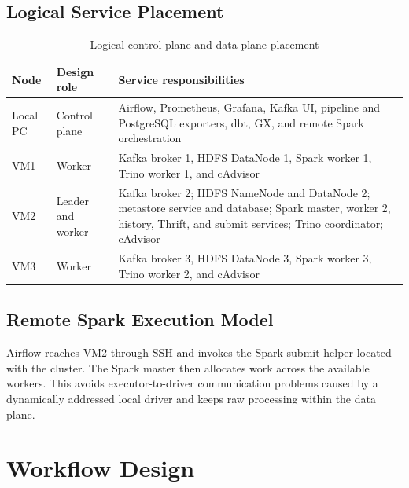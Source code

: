\subsection{Logical Service Placement}
\begin{table}[htbp]
    \centering
    \footnotesize
    \begin{tabularx}{\textwidth}{|>{\RaggedRight\arraybackslash}p{}|>{\RaggedRight\arraybackslash}p{}|>{\RaggedRight\arraybackslash}X|}
        \hline
        \rowcolor{ModernTableHeader}
        \color{white}\textbf{Node} & \color{white}\textbf{Design role} & \color{white}\textbf{Service responsibilities} \\
        \hline
        Local PC & Control plane & Airflow, Prometheus, Grafana, Kafka UI, pipeline and PostgreSQL exporters, dbt, GX, and remote Spark orchestration \\
        \hline
        VM1 & Worker & Kafka broker 1, HDFS DataNode 1, Spark worker 1, Trino worker 1, and cAdvisor \\
        \hline
        VM2 & Leader and worker & Kafka broker 2; HDFS NameNode and DataNode 2; metastore service and database; Spark master, worker 2, history, Thrift, and submit services; Trino coordinator; cAdvisor \\
        \hline
        VM3 & Worker & Kafka broker 3, HDFS DataNode 3, Spark worker 3, Trino worker 2, and cAdvisor \\
        \hline
    \end{tabularx}
    \caption{Logical control-plane and data-plane placement}
    \label{tab:design-logical-placement}
\end{table}

\subsection{Remote Spark Execution Model}
Airflow reaches VM2 through SSH and invokes the Spark submit helper located with the cluster. The Spark master then allocates work across the available workers. This avoids executor-to-driver communication problems caused by a dynamically addressed local driver and keeps raw processing within the data plane.

\section{Workflow Design}


